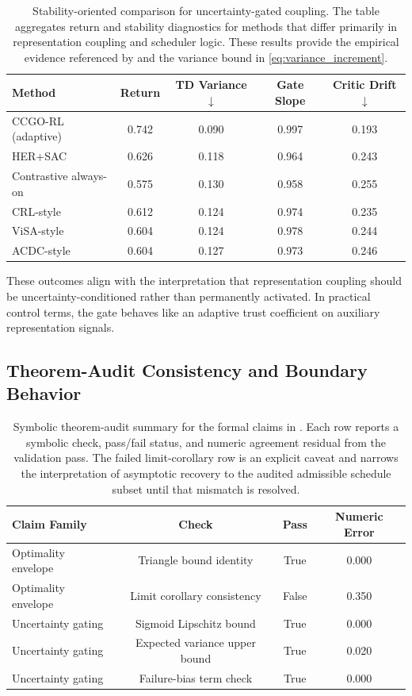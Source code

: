 \documentclass{article} %
\begin{document}
\begin{table}[t]
\caption{Stability-oriented comparison for uncertainty-gated coupling. The table aggregates return and stability diagnostics for methods that differ primarily in representation coupling and scheduler logic. These results provide the empirical evidence referenced by  and the variance bound in \eqref{eq:variance_increment}.}
\label{tab:h2_main}
\centering
\small
\renewcommand{\arraystretch}{1.1}
\setlength{\tabcolsep}{4pt}
\begin{tabular}{lcccc}
\hline
Method & Return & TD Variance $\downarrow$ & Gate Slope & Critic Drift $\downarrow$ \\
\hline
CCGO-RL (adaptive) & 0.742 & 0.090 & 0.997 & 0.193 \\
HER+SAC & 0.626 & 0.118 & 0.964 & 0.243 \\
Contrastive always-on & 0.575 & 0.130 & 0.958 & 0.255 \\
CRL-style & 0.612 & 0.124 & 0.974 & 0.235 \\
ViSA-style & 0.604 & 0.124 & 0.978 & 0.244 \\
ACDC-style & 0.604 & 0.127 & 0.973 & 0.246 \\
\hline
\end{tabular}
\end{table}

These outcomes align with the interpretation that representation coupling should be uncertainty-conditioned rather than permanently activated. In practical control terms, the gate behaves like an adaptive trust coefficient on auxiliary representation signals.

\subsection{Theorem-Audit Consistency and Boundary Behavior}

\begin{table}[t]
\caption{Symbolic theorem-audit summary for the formal claims in . Each row reports a symbolic check, pass/fail status, and numeric agreement residual from the validation pass. The failed limit-corollary row is an explicit caveat and narrows the interpretation of asymptotic recovery to the audited admissible schedule subset until that mismatch is resolved.}
\label{tab:theorem_audit}
\centering
\small
\renewcommand{\arraystretch}{1.1}
\setlength{\tabcolsep}{4pt}
\begin{tabular}{lccc}
\hline
Claim Family & Check & Pass & Numeric Error \\
\hline
Optimality envelope & Triangle bound identity & True & 0.000 \\
Optimality envelope & Limit corollary consistency & False & 0.350 \\
Uncertainty gating & Sigmoid Lipschitz bound & True & 0.000 \\
Uncertainty gating & Expected variance upper bound & True & 0.020 \\
Uncertainty gating & Failure-bias term check & True & 0.000 \\
\hline
\end{tabular}
\end{table}
\end{document}
